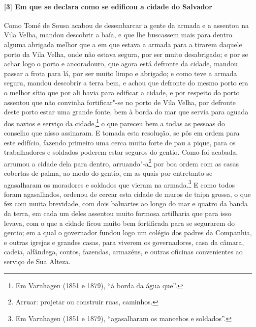 \begin{linenumbers}
\paragraph{[3] Em que se declara como se edificou a cidade do Salvador} \quad
Como Tomé de Sousa acabou de desembarcar a gente da armada e a assentou na Vila Velha,
mandou descobrir a baía, e que lhe buscassem mais para dentro alguma abrigada melhor que a
em que estava a armada para a tirarem daquele porto da Vila Velha, onde não estava segura,
por ser muito desabrigado; e por se achar logo o porto e ancoradouro, que agora está
defronte da cidade, mandou passar a frota para lá, por ser muito limpo e abrigado; e como
teve a armada segura, mandou descobrir a terra bem, e achou que defronte do mesmo porto
era o melhor sítio que por ali havia para edificar a cidade, e por respeito do porto
assentou que não convinha fortificar"-se no porto de Vila Velha, por defronte deste porto
estar uma grande fonte, bem à borda do mar que servia para aguada dos navios e serviço da
cidade,\footnote{ Em Varnhagen (1851 e 1879), ``à borda da água que''.} o que pareceu bem
a todas as pessoas do conselho que nisso assinaram. E tomada esta resolução, se pôs em
ordem para este edifício, fazendo primeiro uma cerca muito forte de pau a pique, para os
trabalhadores e soldados poderem estar seguros do gentio. Como foi acabada, arrumou a
cidade dela para dentro, arruando"-a\footnote{ Arruar: projetar ou construir ruas,
caminhos.} por boa ordem com as casas cobertas de palma, ao modo do gentio, em 
as quais por entretanto se agasalharam os moradores e soldados que vieram na
armada.\footnote{ Em Varnhagen (1851 e 1879), ``agasalharam os mancebos e soldados''.} E
como todos foram agasalhados, ordenou de cercar esta cidade de muros de taipa grossa, o
que fez com muita brevidade, com dois baluartes ao longo do mar e quatro da banda da
terra, em cada um deles assentou muito formosa artilharia que para isso levava, com o que
a cidade ficou muito bem fortificada para se segurarem do gentio; em a qual o governador
fundou logo um colégio dos padres da Companhia, e outras igrejas e grandes casas, para
viverem os governadores, casa da câmara, cadeia, alfândega, contos, fazendas, armazéns, e
outras oficinas convenientes ao serviço de Sua Alteza.


\end{linenumbers}
